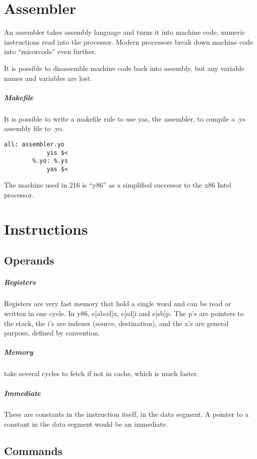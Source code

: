 \documentclass[11pt]{article}
\begin{document}
\section{Assembler}
	An assembler takes assembly language and turns it into machine code, numeric
	instructions read into the processor. Modern processors break down machine
	code into ``micorcode'' even further.

	It is possible to disassemble machine code back into assembly, but any
	variable names and variables are lost.

	\subparagraph{Makefile} It is possible to write a makefile rule to use yas,
	the assembler, to compile a .ys assembly file to .yo.

	\begin{lstlisting}[autogobble=true]
		all: assembler.yo
			yis $<
		%.yo: %.ys
			yas $<
	\end{lstlisting}

	The machine used in 216 is ``y86'' as a simplified successor to the x86
	Intel processor.

\section{Instructions}
	\subsection{Operands}

		\subparagraph{Registers} Registers are very fast memory that hold a single
		word and  can be read or written in one cycle. In y86, e[abcd]x, e[sd]i and e[sb]p. The p's are
		pointers to the stack, the i's are indexes (source, destination), and the
		x's are general purpose, defined by convention.

		\subparagraph{Memory} take several cycles to fetch if not in cache, which is
		much faster.

		\subparagraph{Immediate} These are constants in the instruction itself, in
		the data segment. A pointer to a constant in the data segment would be an
		immediate.

	\subsection{Commands}
	
\end{document}
